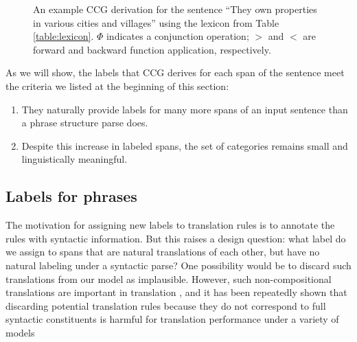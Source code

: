 \documentclass[a4paper]{article}
\begin{document}
\begin{figure}
\centering
{}
\caption{An example CCG derivation for the sentence ``They own properties in various cities and villages'' using the lexicon from Table \ref{table:lexicon}. $\Phi$ indicates a conjunction operation; $>$ and $<$ are forward and backward function application, respectively.\label{fig:ccg-derivation}}
\end{figure}

As we will show, the labels that CCG derives for each span of the sentence meet the criteria we listed at the beginning of this section:
\begin{enumerate}
\item They naturally provide labels for many more spans of an input sentence than a phrase structure parse does.
\item Despite this increase in labeled spans, the set of categories remains small and linguistically meaningful.
\end{enumerate}

\subsection{Labels for phrases}

The motivation for assigning new labels to translation rules is to annotate the rules with syntactic information. But this raises a design question: what label do we assign to spans that are natural translations of each other, but have no natural labeling under a syntactic parse?
One possibility would be to discard such translations from our model as implausible. However, such non-compositional translations are important in translation \cite{fox:2002:emnlp}, and it has been repeatedly shown that discarding potential translation rules because they do not correspond to full syntactic constituents is harmful for translation performance under a variety of models \cite{koehn-och-marcu-2003,deneefe-syntax-and-phrase-mt} 
\end{document}
